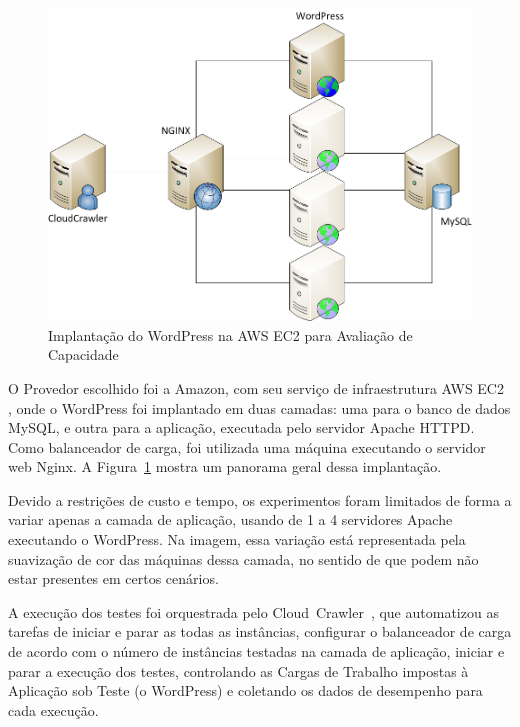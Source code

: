 \begin{figure}[hbt]
  \begin{center}
    \includegraphics[scale=0.4]{img/ImplantacaoWordPress}
  \end{center}
  \caption{\label{fig:implantacao}Implantação do WordPress na AWS EC2 para Avaliação de Capacidade}
\end{figure}

O Provedor escolhido foi a Amazon, com seu serviço de infraestrutura AWS EC2
\cite{ec2}, onde o WordPress foi implantado em duas camadas: uma para o banco de 
dados MySQL, e outra para a aplicação, executada pelo servidor Apache HTTPD. Como
balanceador de carga, foi utilizada uma máquina executando o servidor web Nginx. A
Figura~\ref{fig:implantacao} mostra um panorama geral dessa implantação. 

Devido a restrições de custo e tempo, os experimentos foram limitados de forma a variar 
apenas a camada de aplicação, usando de 1 a 4 servidores Apache executando o WordPress. 
Na imagem, essa variação está representada pela suavização de cor das máquinas dessa 
camada, no sentido de que podem não estar presentes em certos cenários.

A execução dos testes foi orquestrada pelo Cloud~Crawler~\cite{cunha2012ambiente},
que automatizou as tarefas de iniciar e parar as todas as instâncias, configurar 
o balanceador de carga de acordo com o número de instâncias testadas na camada de 
aplicação, iniciar e parar a execução dos testes, controlando as Cargas de Trabalho
impostas à Aplicação sob Teste (o WordPress) e coletando os dados de desempenho 
para cada execução. 

